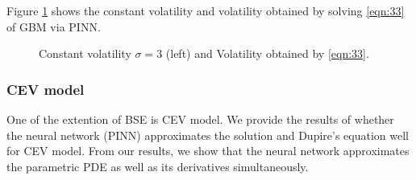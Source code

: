 \documentclass[11pt,reqno]{article}
\numberwithin{equation}{section}
\begin{document}
{Figure \ref{fig:2:6} shows the constant volatility and volatility obtained by solving \eqref{eqn:33}
 of GBM via PINN.
\begin{figure}[H] \centering
     \vspace{-3mm}
    \caption{Constant volatility $\sigma=3$ (left) and Volatility obtained by \eqref{eqn:33}.}
    \label{fig:2:6}
\end{figure}

\subsubsection{CEV model}

One of the extention of BSE is CEV model.
We provide the results of whether the neural network (PINN) approximates the solution
 and Dupire's equation well for CEV model.
From our results, we show that the neural network approximates the parametric PDE
 as well as its derivatives simultaneously. 

}
\end{document}
